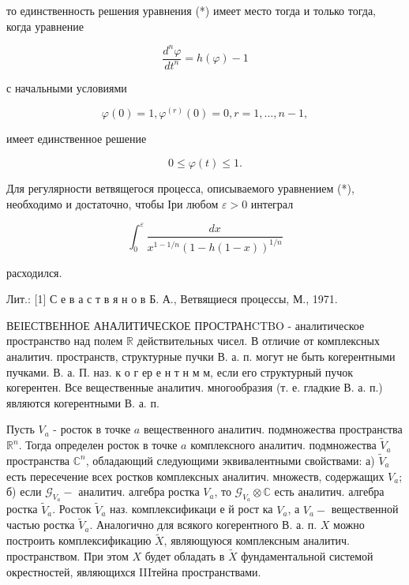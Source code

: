 \documentclass[10pt]{article}
\begin{document}
то единственность решения уравнения (*) имеет место тогда и только тогда, когда уравнение



\[

\frac{d^{n} \varphi}{d t^{n}}=h(\varphi)-1

\]



с начальными условиями



\[

\varphi(0)=1, \varphi^{(r)}(0)=0, r=1, \ldots, n-1,

\]



имеет единственное решение



\[

0 \leqslant \varphi(t) \leqslant 1 .

\]



Для регулярности ветвящегося процесса, описываемого уравнением (*), необходимо и достаточно, чтобы Іри любом $\varepsilon>0$ интеграл



\[

\int_{0}^{\varepsilon} \frac{d x}{x^{1-1 / n}(1-h(1-x))^{1 / n}}

\]



расходился.



Лит.: [1] С е в а с т в я н о в Б. А., Ветвящиеся процессы, М., 1971.



ВЕІЕСТВЕННОЕ АНАЛИТИЧЕСКОЕ ПРОСТРАНCTBO - аналитическое пространство над полем $\mathbb{R}$ действительных чисел. В отличие от комплексных аналитич. пространств, структурные пучки В. а. п. могут не быть когерентными пучками. В. а. П. наз. к о г ер е н т н м м, если его структурный пучок когерентен. Все вещественные аналитич. многообразия (т. е. гладкие В. а. п.) являются когерентными В. а. п.



Пусть $V_{a}$ - росток в точке $a$ вещественного аналитич. подмножества пространства $\mathbb{R}^{n}$. Тогда определен росток в точке $a$ комплексного аналитич. подмножества $\widetilde{V}_{a}$ пространства $\mathbb{C}^{n}$, обладающий следующими эквивалентными свойствами: а) $\tilde{V}_{a}$ есть пересечение всех ростков комплексных аналитич. множеств, содержащих $V_{a}$; б) если $\mathcal{G}_{V_{a}}-$ аналитич. алгебра ростка $V_{a}$, то $\mathcal{G}_{V_{a}} \otimes \mathbb{C}$ есть аналитич. алгебра ростка $\tilde{V}_{a}$. Росток $\tilde{V}_{a}$ наз. комплексификаци е й рост ка $V_{a}$, а $V_{a}-$ вещественной частью ростка $\tilde{V}_{a}$. Аналогично для всякого когерентного В. а. п. $X$ можно построить комплексификацию $\tilde{X}$, являющуюся комплексным аналитич. пространством. При этом $X$ будет обладать в $\tilde{X}$ фундаментальной системой окрестностей, являющихся IIIтейна пространствами.
\end{document}
